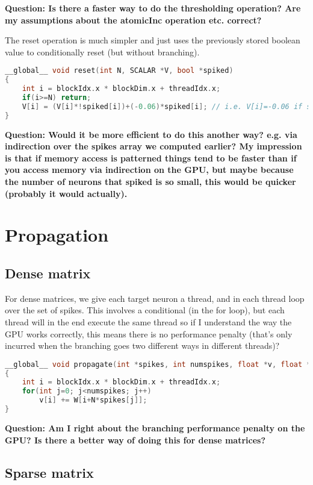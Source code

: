 \documentclass[a4paper]{article}
\newcommand{\question}[1]{\textbf{Question: #1}}
\begin{document}
\question{Is there a faster way to do the thresholding operation? Are my assumptions about the atomicInc operation etc. correct?}

The reset operation is much simpler and just uses the previously stored boolean value to conditionally reset (but without branching).

\begin{lstlisting}[language=C++]
__global__ void reset(int N, SCALAR *V, bool *spiked)
{
    int i = blockIdx.x * blockDim.x + threadIdx.x;
    if(i>=N) return;
    V[i] = (V[i]*!spiked[i])+(-0.06)*spiked[i]; // i.e. V[i]=-0.06 if spiked[i]
}
\end{lstlisting}

\question{Would it be more efficient to do this another way? e.g. via indirection over the spikes array we computed earlier? My impression is that if memory access is patterned things tend to be faster than if you access memory via indirection on the GPU, but maybe because the number of neurons that spiked is so small, this would be quicker (probably it would actually).}

\section{Propagation}

\subsection{Dense matrix}

For dense matrices, we give each target neuron a thread, and in each thread loop over the set of spikes. This involves a conditional (in the for loop), but each thread will in the end execute the same thread so if I understand the way the GPU works correctly, this means there is no performance penalty (that's only incurred when the branching goes two different ways in different threads)?

\begin{lstlisting}[language=C++]
__global__ void propagate(int *spikes, int numspikes, float *v, float *W, int N)
{
    int i = blockIdx.x * blockDim.x + threadIdx.x;
    for(int j=0; j<numspikes; j++)
        v[i] += W[i+N*spikes[j]];
}
\end{lstlisting}

\question{Am I right about the branching performance penalty on the GPU? Is there a better way of doing this for dense matrices?}

\subsection{Sparse matrix}
\end{document}
